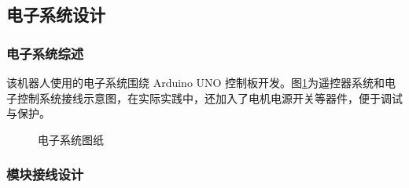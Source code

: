 \documentclass[a4paper]{ctexart}
\numberwithin{equation}{section}
\numberwithin{table}{section}
\numberwithin{figure}{section}
\begin{document}
\subsection{电子系统设计}

\subsubsection{电子系统综述}

该机器人使用的电子系统围绕 Arduino UNO 控制板开发。图\ref{fig_elec}为遥控器系统和电子控制系统接线示意图，在实际实践中，还加入了电机电源开关等器件，便于调试与保护。


\begin{figure}[H]
  \centering
  \hfill
  \caption{电子系统图纸}
  \label{fig_elec}
\end{figure}

\subsubsection{模块接线设计}
\end{document}
